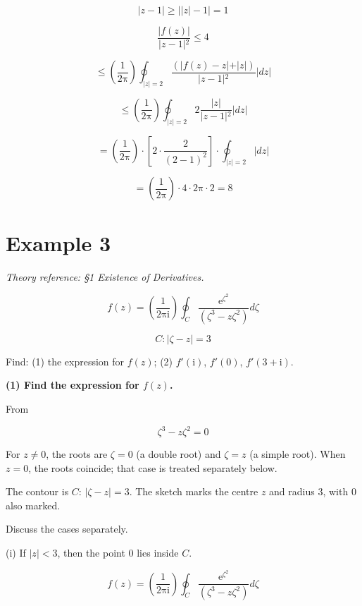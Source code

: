 \documentclass[11pt,a4paper]{article}
\theoremstyle{definition}
\theoremstyle{plain}
\begin{document}
\[
\vert{}z - 1\vert{} \ge \vert{}\vert{}z\vert{} - 1\vert{} = 1
\]

\[
\frac{\vert{}f(z)\vert{}}{\vert{}z - 1\vert{}^{2}} \le 4
\]

\[
\le \left(\frac{1}{2\mathrm{\pi}}\right)\oint_{\vert{}z\vert{} = 2}\frac{(\vert{}f(z) - z\vert{} + \vert{}z\vert{})}{\vert{}z - 1\vert{}^{2}}\vert{}dz\vert{}
\]

\[
\le \left(\frac{1}{2\mathrm{\pi}}\right)\oint_{\vert{}z\vert{} = 2}2\frac{\vert{}z\vert{}}{\vert{}z - 1\vert{}^{2}}\vert{}dz\vert{}
\]

\[
= \left(\frac{1}{2\mathrm{\pi}}\right) \cdot[2 \cdot \frac{2}{(2 - 1)^{2}}] \cdot \oint_{\vert{}z\vert{} = 2}\vert{}dz\vert{}
\]

\[
= \left(\frac{1}{2\mathrm{\pi}}\right) \cdot 4 \cdot 2\mathrm{\pi} \cdot 2 = 8
\]

\section*{Example 3}

\textit{Theory reference: §1 Existence of Derivatives.}

\begin{equation}
f(z) = \left(\frac{1}{2\mathrm{\pi}\mathrm{i}}\right)\oint_{C}\frac{\mathrm{e}^{\zeta^{2}}}{(\zeta^{3} - z\zeta^{2})}d\zeta
\end{equation}

\[
C:\vert{}\zeta - z\vert{} = 3
\]

Find: (1) the expression for $f(z)$; (2) $f'(\mathrm{i})$, $f'(0)$, $f'(3 + \mathrm{i})$.

\textbf{(1) Find the expression for $f(z)$.}

From

\begin{equation}
\zeta^{3} - z\zeta^{2} = 0
\end{equation}

For $z \ne 0$, the roots are $\zeta = 0$ (a double root) and $\zeta = z$ (a simple root). When $z = 0$, the roots coincide; that case is treated separately below.

The contour is $C$: $\vert{}\zeta - z\vert{} = 3$. The sketch marks the centre $z$ and radius 3, with 0 also marked.

Discuss the cases separately.

(i) If $\vert{}z\vert{} < 3$, then the point 0 lies inside $C$.

\begin{equation}
f(z) = \left(\frac{1}{2\mathrm{\pi}\mathrm{i}}\right)\oint_{C}\frac{\mathrm{e}^{\zeta^{2}}}{(\zeta^{3} - z\zeta^{2})}d\zeta
\end{equation}
\end{document}
